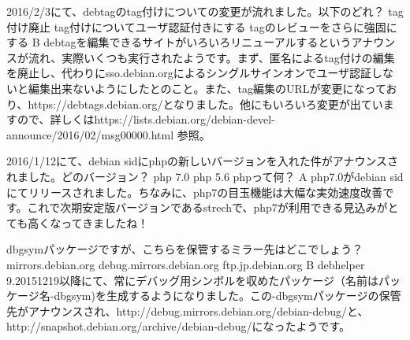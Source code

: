 %

\santaku
{2016/2/3にて、debtagのtag付けについての変更が流れました。以下のどれ？}
{tag付け廃止}
{tag付けについてユーザ認証付きにする}
{tagのレビューをさらに強固にする}
{B}
{debtagを編集できるサイトがいろいろリニューアルするというアナウンスが流れ、実際いくつも実行されたようです。まず、匿名によるtag付けの編集を廃止し、代わりにsso.debian.orgによるシングルサインオンでユーザ認証しないと編集出来ないようにしたとのこと。また、tag編集のURLが変更になっており、https://debtags.debian.org/となりました。他にもいろいろ変更が出ていますので、詳しくはhttps://lists.debian.org/debian-devel-announce/2016/02/msg00000.html 参照。}

\santaku
{2016/1/12にて、debian sidにphpの新しいバージョンを入れた件がアナウンスされました。どのバージョン？}
{php 7.0}
{php 5.6}
{phpって何？}
{A}
{php7.0がdebian sidにてリリースされました。ちなみに、php7の目玉機能は大幅な実効速度改善です。これで次期安定版バージョンであるstrechで、php7が利用できる見込みがとても高くなってきましたね！}

\santaku
{dbgsymパッケージですが、こちらを保管するミラー先はどこでしょう？}
{mirrors.debian.org}
{debug.mirrors.debian.org}
{ftp.jp.debian.org}
{B}
{debhelper 9.20151219以降にて、常にデバッグ用シンボルを収めたパッケージ（名前はパッケージ名-dbgsym)を生成するようになりました。この-dbgsymパッケージの保管先がアナウンスされ、http://debug.mirrors.debian.org/debian-debug/と、http://snapshot.debian.org/archive/debian-debug/になったようです。}

